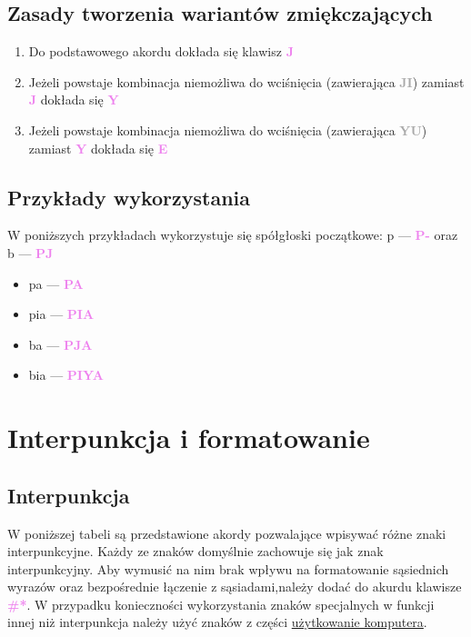 \documentclass[12p, oneside]{book}
\newcommand{\steno}[1]{\textbf{\textsf{\textcolor{violet}{ #1}}}}
\newcommand{\stenoErr}[1]{\textbf{\textsf{\textcolor{darkgray}{ #1}}}}
\begin{document}
\subsection{Zasady tworzenia wariantów zmiękczających}

\begin{enumerate}
	\item Do podstawowego akordu dokłada się klawisz \steno{J}
	\item Jeżeli powstaje kombinacja niemożliwa do wciśnięcia (zawierająca
		\stenoErr{JI}) zamiast \steno{J} dokłada się \steno{Y}
	\item Jeżeli powstaje kombinacja niemożliwa do wciśnięcia (zawierająca
		\stenoErr{YU}) zamiast \steno{Y} dokłada się \steno{E}
\end{enumerate}

\subsection{Przykłady wykorzystania}
W poniższych przykładach wykorzystuje się spółgłoski początkowe: p ---
\steno{P-} oraz b --- \steno{PJ}
\begin{itemize}
	\item pa --- \steno{PA}
	\item pia --- \steno{PIA}
	\item ba --- \steno{PJA}
	\item bia --- \steno{PIYA}
\end{itemize}

\newpage

\section{Interpunkcja i formatowanie}
\label{sec:interpunkcja}

\subsection{Interpunkcja}

W poniższej tabeli są przedstawione akordy pozwalające wpisywać różne znaki 
interpunkcyjne. Każdy ze znaków domyślnie zachowuje się jak znak 
interpunkcyjny. Aby wymusić na nim brak wpływu na formatowanie sąsiednich 
wyrazów oraz bezpośrednie łączenie z sąsiadami,należy dodać do akurdu klawisze 
\steno{\#*}. W przypadku konieczności wykorzystania znaków specjalnych w 
funkcji innej niż interpunkcja należy użyć znaków z części \hyperref
[sec:komputer]{użytkowanie komputera}.
\end{document}
